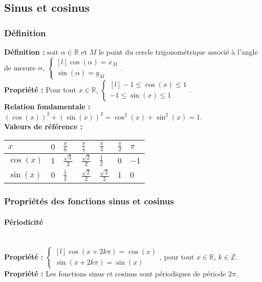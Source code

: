 \documentclass[a4paper,titlepage]{article}
\begin{document}
    \subsection{Sinus et cosinus}
        \subsubsection{Définition}
            \textbf{Définition :} soit $\alpha\in\mathbb{R}$ et $M$ le point du cercle trigonométrique associé à l’angle de mesure $\alpha$, $\left\{\begin{smallmatrix*}[l]\cos\left(\alpha\right)=x_{M}\\\sin\left(\alpha\right)=y_{M}\end{smallmatrix*}\!\right.$.
            \\
            \textbf{Propriété :} Pour tout $x\in\mathbb{R}$, $\left\{\begin{smallmatrix*}[l]-1\leqslant\cos\left(x\right)\leqslant1\\-1\leqslant\sin\left(x\right)\leqslant1\end{smallmatrix*}\!\right.$.
            \\
            \textbf{Relation fondamentale :} $\left(\cos\left(x\right)\right)^{2}+\left(\sin\left(x\right)\right)^{2}=\cos^{2}\left(x\right)+\sin^{2}\left(x\right)=1$.
            \\
            \textbf{Valeurs de référence :}
            \\
            \begin{tabularx}{\linewidth}{|Y|Y|Y|Y|Y|Y|Y|}
                \hline
                $x$&$0$&$\frac{\pi}{6}$&$\frac{\pi}{4}$&$\frac{\pi}{3}$&$\frac{\pi}{2}$&$\pi$\\
                \hline
                $\cos\left(x\right)$&$1$&$\frac{\sqrt{3}}{2}$&$\frac{\sqrt{2}}{2}$&$\frac{1}{2}$&$0$&$-1$\\
                \hline
                $\sin\left(x\right)$&$0$&$\frac{1}{2}$&$\frac{\sqrt{2}}{2}$&$\frac{\sqrt{3}}{2}$&$1$&$0$\\
                \hline
            \end{tabularx}
        \subsubsection{Propriétés des fonctions sinus et cosinus}
            \paragraph{Périodicité}\mbox{}\\
                \textbf{Propriété :} $\left\{\begin{smallmatrix*}[l]\cos\left(x+2k\pi\right)=\cos\left(x\right)\\\sin\left(x+2k\pi\right)=\sin\left(x\right)\end{smallmatrix*}\!\right.$, pour tout $x\in\mathbb{R}$, $k\in\mathbb{Z}$.
                \\
                \textbf{Propriété :} Les fonctions sinus et cosinus sont périodiques de période $2\pi$.
\end{document}
